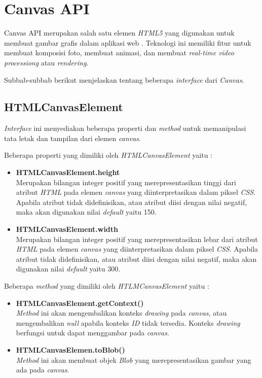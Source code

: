 \section{Canvas API}
\label{sec:Canvas API}
 
Canvas API merupakan salah satu elemen \textit{HTML5} yang digunakan untuk membuat gambar grafis dalam aplikasi web \cite{canvas}. Teknologi ini memiliki fitur untuk membuat komposisi foto, membuat animasi, dan membuat \textit{real-time video processiong} atau \textit{rendering}. 

Subbab-subbab berikut menjelaskan tentang beberapa \textit{interface} dari \textit{Canvas}.

\subsection{HTMLCanvasElement}
\textit{Interface} ini menyediakan beberapa properti dan \textit{method} untuk memanipulasi tata letak dan tampilan dari elemen \textit{canvas}.

Beberapa properti yang dimiliki oleh \textit{HTMLCanvasElement} yaitu : 

\begin{itemize}
	\item \textbf{HTMLCanvasElement.height} \\ Merupakan bilangan integer positif yang merepresentasikan tinggi dari atribut \textit{HTML} pada elemen \textit{canvas} yang diinterpretasikan dalam piksel \textit{CSS}. Apabila atribut tidak didefinisikan, atau atribut diisi dengan nilai negatif, maka akan digunakan nilai \textit{default} yaitu 150.
	\item \textbf{HTMLCanvasElement.width} \\ Merupakan bilangan integer positif yang merepresentasikan lebar dari atribut \textit{HTML} pada elemen \textit{canvas} yang diinterpretasikan dalam piksel \textit{CSS}. Apabila atribut tidak didefinisikan, atau atribut diisi dengan nilai negatif, maka akan digunakan nilai \textit{default} yaitu 300.
\end{itemize}

Beberapa \textit{method} yang dimiliki oleh \textit{HTLMCanvasElement} yaitu : 

\begin{itemize}
	\item \textbf{HTMLCanvasElement.getContext()} \\ \textit{Method} ini akan mengembalikan konteks \textit{drawing} pada \textit{canvas}, atau mengembalikan \textit{null} apabila konteks \textit{ID} tidak tersedia. Konteks \textit{drawing} berfungsi untuk dapat menggambar pada \textit{canvas}.
	\item \textbf{HTMLCanvasElemen.toBlob()} \\ \textit{Method} ini akan membuat objek \textit{Blob} yang merepresentasikan gambar yang ada pada \textit{canvas}. 
	
\end{itemize}


